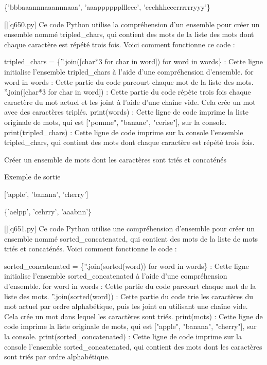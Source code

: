 \{'bbbaaannnaaannnaaa', 'aaappppppllleee', 'ccchhheeerrrrrryyy'\}
        \par
        \begin{solution}
            \renewcommand{\nomfichier}{q650.py}
            \pythonfile{\chemincode \nomfichier}[][\nomfichier]
            Ce code Python utilise la compréhension d'un ensemble pour créer un ensemble nommé tripled\_chars, qui contient des mots de la liste des mots dont chaque caractère est répété trois fois. Voici comment fonctionne ce code :

    tripled\_chars = \{''.join([char*3 for char in word]) for word in words\} : Cette ligne initialise l'ensemble tripled\_chars à l'aide d'une compréhension d'ensemble.
        for word in words : Cette partie du code parcourt chaque mot de la liste des mots.
        ''.join([char*3 for char in word]) : Cette partie du code répète trois fois chaque caractère du mot actuel et les joint à l'aide d'une chaîne vide. Cela crée un mot avec des caractères triplés.
    print(words) : Cette ligne de code imprime la liste originale de mots, qui est ["pomme", "banane", "cerise"], sur la console.
    print(tripled\_chars) : Cette ligne de code imprime sur la console l'ensemble tripled\_chars, qui contient des mots dont chaque caractère est répété trois fois.
        \end{solution}
        

        \question
        Créer un ensemble de mots dont les caractères sont triés et concaténés

Exemple de sortie

['apple', 'banana', 'cherry']

\{'aelpp', 'cehrry', 'aaabnn'\}
        \par
        \begin{solution}
            \renewcommand{\nomfichier}{q651.py}
            \pythonfile{\chemincode \nomfichier}[][\nomfichier]
            Ce code Python utilise une compréhension d'ensemble pour créer un ensemble nommé sorted\_concatenated, qui contient des mots de la liste de mots triés et concaténés. Voici comment fonctionne le code :

    sorted\_concatenated = \{''.join(sorted(word)) for word in words\} : Cette ligne initialise l'ensemble sorted\_concatenated à l'aide d'une compréhension d'ensemble.
        for word in words : Cette partie du code parcourt chaque mot de la liste des mots.
        ''.join(sorted(word)) : Cette partie du code trie les caractères du mot actuel par ordre alphabétique, puis les joint en utilisant une chaîne vide. Cela crée un mot dans lequel les caractères sont triés.
    print(mots) : Cette ligne de code imprime la liste originale de mots, qui est ["apple", "banana", "cherry"], sur la console.
    print(sorted\_concatenated) : Cette ligne de code imprime sur la console l'ensemble sorted\_concatenated, qui contient des mots dont les caractères sont triés par ordre alphabétique.
        \end{solution}
        

